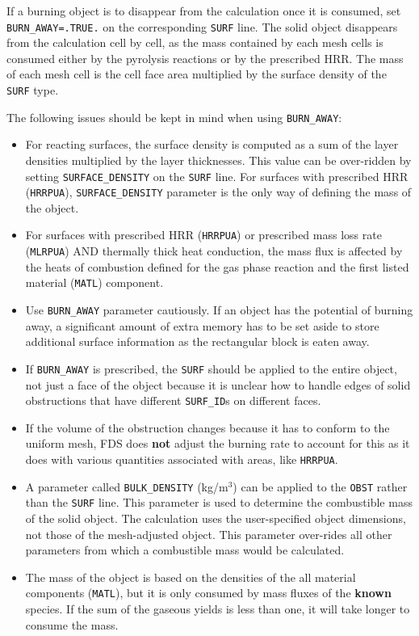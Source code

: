 \documentclass[11pt]{book}
\newcommand{\ct}{\tt\small}
\begin{document}
If a burning object is to disappear from the calculation once it is consumed, set {\ct BURN\_AWAY=.TRUE.} on the corresponding
{\ct SURF} line. The solid object disappears from the calculation cell by cell, as the mass contained by each mesh cells is consumed
either by the pyrolysis reactions or by the prescribed HRR.  The mass of each mesh cell is the cell face area multiplied by the
surface density of the {\ct SURF} type.

The following issues should be kept in mind when using {\ct BURN\_AWAY}:
\begin{itemize}
\item  For reacting surfaces, the surface density is computed as a sum of the layer densities multiplied by the layer thicknesses.
This value can be over-ridden by setting {\ct SURFACE\_DENSITY} on the {\ct SURF} line. For surfaces with prescribed HRR
({\ct HRRPUA}), {\ct SURFACE\_DENSITY} parameter is the only way of defining the mass of the object.
\item For surfaces with prescribed HRR ({\ct HRRPUA}) or prescribed mass loss rate ({\ct MLRPUA}) AND thermally thick heat conduction,
the mass flux is affected by the heats of combustion defined for the gas phase reaction and the first listed material ({\ct MATL}) component.
\item Use {\ct BURN\_AWAY} parameter cautiously. If an object has the potential of burning away, a significant
amount of extra memory has to be set aside to store additional surface information as the rectangular block is
eaten away.
\item If {\ct BURN\_AWAY} is prescribed, the {\ct SURF} should be applied to the entire object, not just a face of the object
because it is unclear how to handle edges of solid obstructions that have different {\ct SURF\_ID}s on different faces.
\item If the volume of the obstruction changes because it has to conform to the uniform mesh,
FDS does {\bf not} adjust the burning rate to account for this as it does with various quantities associated with areas,
like {\ct HRRPUA}.
\item A parameter called {\ct BULK\_DENSITY} (kg/m$^3$) can be applied to the {\ct OBST} rather than the {\ct SURF} line. This parameter is used
to determine the combustible mass of the solid object. The calculation uses the user-specified object dimensions, not those of the mesh-adjusted
object. This parameter over-rides all other parameters from which a combustible mass would be calculated.
\item The mass of the object is based on the densities of the all material components ({\ct MATL}), but it is only consumed by mass fluxes of
the {\bf known} species. If the sum of the gaseous yields is less than one, it will take longer to consume the mass.
\end{itemize}
\end{document}
